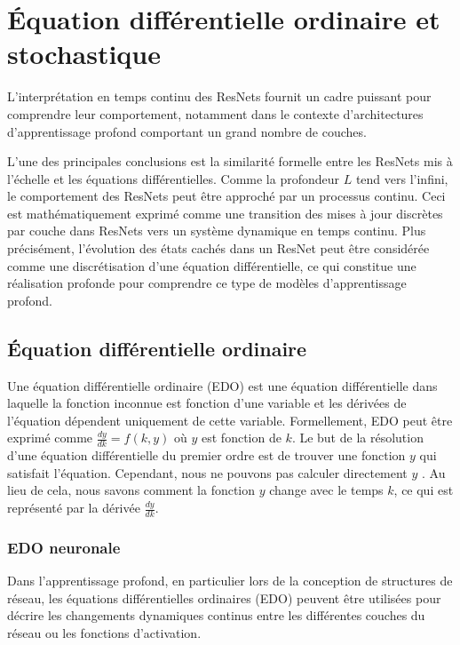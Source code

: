 \chapter{Équation différentielle ordinaire et stochastique}
L'interprétation en temps continu des ResNets fournit un cadre puissant pour comprendre leur comportement, notamment dans le contexte d'architectures d'apprentissage profond comportant un grand nombre de couches.

L'une des principales conclusions est la similarité formelle entre les ResNets mis à l'échelle et les équations différentielles. Comme la profondeur \(L\) tend vers l'infini, le comportement des ResNets peut être approché par un processus continu. Ceci est mathématiquement exprimé comme une transition des mises à jour discrètes par couche dans ResNets vers un système dynamique en temps continu. Plus précisément, l'évolution des états cachés dans un ResNet peut être considérée comme une discrétisation d'une équation différentielle, ce qui constitue une réalisation profonde pour comprendre ce type de modèles d'apprentissage profond.

\section{Équation différentielle ordinaire}
Une équation différentielle ordinaire (EDO) est une équation différentielle dans laquelle la fonction inconnue est fonction d'une variable et les dérivées de l'équation dépendent uniquement de cette variable. Formellement, EDO peut être exprimé comme $\frac{dy}{dk}=f(k,y)$ où $y$ est fonction de $k$.
Le but de la résolution d'une équation différentielle du premier ordre est de trouver une fonction $y$ qui satisfait l'équation. Cependant, nous ne pouvons pas calculer directement $y$
. Au lieu de cela, nous savons comment la fonction $y$ change avec le temps $k$, ce qui est représenté par la dérivée $\frac{dy}{dk}$.

\subsection{EDO neuronale}
Dans l'apprentissage profond, en particulier lors de la conception de structures de réseau, les équations différentielles ordinaires (EDO) peuvent être utilisées pour décrire les changements dynamiques continus entre les différentes couches du réseau ou les fonctions d'activation.

